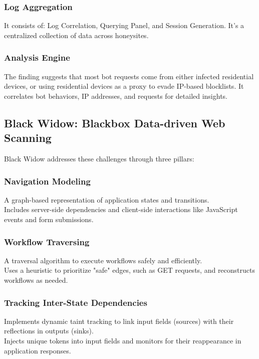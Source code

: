 \documentclass[conference]{IEEEtran}
\begin{document}
\subsubsection{Log Aggregation}
It consists of: Log	Correlation, Querying Panel, and Session	Generation. It's a centralized collection of data across honeysites.
\subsubsection{Analysis Engine}
The finding suggests that most bot requests come from either infected residential devices, or using residential devices as a proxy to evade IP-based blocklists. It correlates bot behaviors, IP addresses, and requests for detailed insights.

\subsection{\textbf{Black Widow: Blackbox Data-driven Web Scanning} }
Black Widow addresses these challenges through three pillars:
\subsubsection{Navigation Modeling}
A graph-based representation of application states and transitions.\\
Includes server-side dependencies and client-side interactions like JavaScript events and form submissions.
\subsubsection{Workflow Traversing}
A traversal algorithm to execute workflows safely and efficiently.\\
Uses a heuristic to prioritize "safe" edges, such as GET requests, and reconstructs workflows as needed.
\subsubsection{Tracking Inter-State Dependencies}
Implements dynamic taint tracking to link input fields (sources) with their reflections in outputs (sinks).\\
Injects unique tokens into input fields and monitors for their reappearance in application responses.
\end{document}
